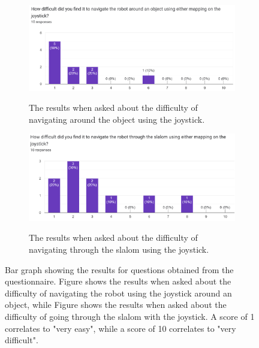 \documentclass{l4proj}
\begin{document}
\begin{appendices}
\\\\

\begin{figure}[!ht]
    \centering
    \begin{subfigure}{0.9\textwidth}
        \includegraphics[width=\textwidth]{images/joystick-object-difficulty.png}
        \label{fig:joystick-object-difficulty}
        \caption{The results when asked about the difficulty of navigating around the object using the joystick.}
    \end{subfigure}
    \begin{subfigure}{0.9\textwidth}
        \includegraphics[width=\textwidth]{images/joystick-slalom-difficulty.png}
        \label{fig:joystick-slalom-difficulty}
        \caption{The results when asked about the difficulty of navigating through the slalom using the joystick.}
    \end{subfigure}
    \caption{Bar graph showing the results for questions obtained from the questionnaire. Figure  shows the results when asked about the difficulty of navigating the robot using the joystick around an object, while Figure  shows the results when asked about the difficulty of going through the slalom with the joystick. A score of 1 correlates to "very easy", while a score of 10 correlates to "very difficult".}
    \label{fig:manual-difficulty}
\end{figure}



\end{appendices}
\end{document}
